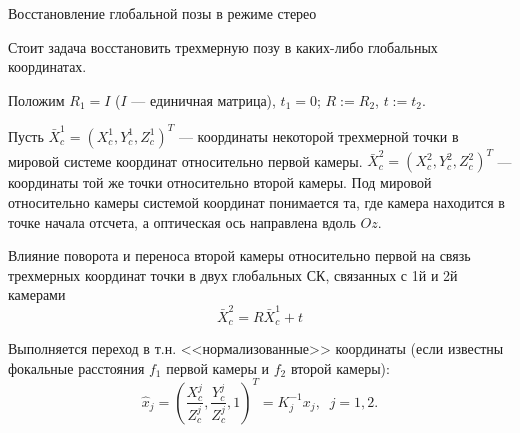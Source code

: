 \documentclass[9pt,aspectratio=169]{beamer}
\begin{document}
\begin{frame}{Восстановление глобальной позы в режиме стерео}

Стоит задача восстановить трехмерную позу в каких-либо
глобальных координатах.

Положим $R_1 = I$ ($I$ --- единичная матрица), $t_1 = 0$;
$R := R_2$, $t := t_2$.

Пусть $\bar{X}_c^1=(X_c^1, Y_c^1, Z_c^1)^T$ --- координаты некоторой
трехмерной точки в мировой системе координат относительно первой камеры.
$\bar{X}_c^2=(X_c^2, Y_c^2, Z_c^2)^T$ --- координаты той же точки относительно
второй камеры. Под мировой относительно камеры системой координат понимается та,
где камера находится в точке начала отсчета, а оптическая ось направлена вдоль $Oz$.
\begin{block}{Влияние поворота и переноса второй камеры относительно первой
на связь трехмерных координат точки в двух глобальных СК, связанных с 1й и 2й камерами}
\[
\bar{X}_c^2 = R\bar{X}_c^1 + t
\]
\end{block}


Выполняется переход в т.н. <<нормализованные>> координаты (если
известны фокальные расстояния $f_1$ первой камеры и $f_2$ второй
камеры):
\[
\hat{x}_j = (\frac{X_c^j}{Z_c^j}, \frac{Y_c^j}{Z_c^j}, 1)^T = K^{-1}_jx_j, \;\; j = 1,2.
\]


\end{frame}
\end{document}
